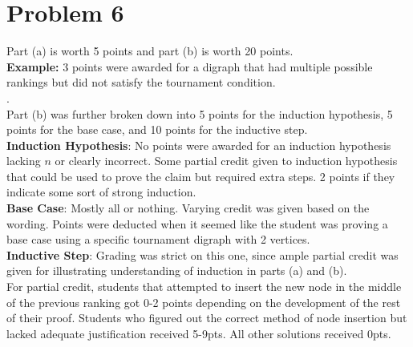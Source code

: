 \documentclass{article}
\begin{document}
\section*{Problem 6}
Part (a) is worth 5 points and part (b) is worth 20 points.  \\
\textbf{Example:} 3 points were awarded for a digraph that had multiple possible rankings but did not satisfy the tournament condition. \\
.\\
Part (b) was further broken down into 5 points for the induction hypothesis, 5 points for the base case, and 10 points for the inductive step. \\
\textbf{Induction Hypothesis}: No points were awarded for an induction hypothesis lacking $n$ or clearly incorrect. Some partial credit given to induction hypothesis that could be used to prove the claim but required extra steps. 2 points if they indicate some sort of strong induction.\\
\textbf{Base Case}: Mostly all or nothing. Varying credit was given based on the wording. Points were deducted when it seemed like the student was proving a base case using a specific tournament digraph with 2 vertices. \\
\textbf{Inductive Step}: Grading was strict on this one, since ample partial credit was given for illustrating understanding of induction in parts (a) and (b). \\ 
For partial credit, students that attempted to insert the new node in the middle of the previous ranking got 0-2 points depending on the development of the rest of their proof. Students who figured out the correct method of node insertion but lacked adequate justification received 5-9pts.  
All other solutions received 0pts.
\end{document}

